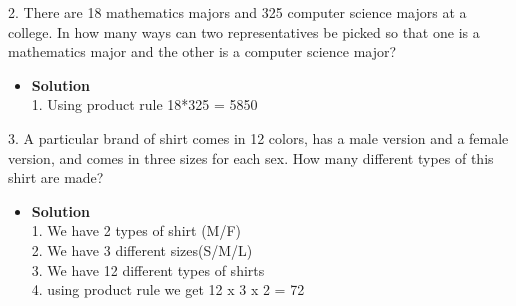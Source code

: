 \documentclass[11pt]{article}
\begin{document}
\begin{enumerate}

\begin{flushleft}
{\large 2. There are 18 mathematics majors and 325 computer science majors at a college. In how many ways can two representatives be picked so that one is a mathematics major and the other is a computer science major?}
\end{flushleft}

\begin{itemize}

\item \textbf{Solution}\\
\large 1. Using product rule 18*325 = 5850\\


\end {itemize}
\end {enumerate}


\begin{enumerate}

\begin{flushleft}
{\large 3. A particular brand of shirt comes in 12 colors, has a male version and a female version, and comes in
three sizes for each sex. How many different types of this shirt are made?}
\end{flushleft}

\begin{itemize}

\item \textbf{Solution}\\
\large 1. We have 2 types of shirt (M/F)\\
\large 2. We have 3 different sizes(S/M/L)\\
\large 3. We have 12 different types of shirts\\
\large 4. using product rule we get 12 x 3 x 2 = 72\\


\end {itemize}
\end {enumerate}
\end{document}
